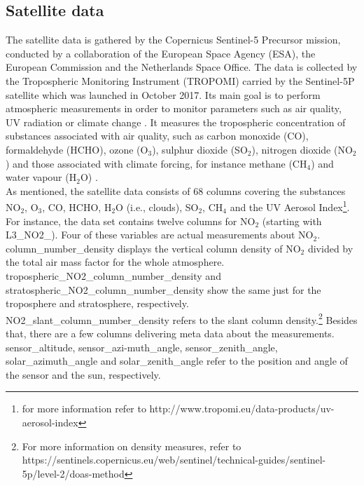 \documentclass{article}
\begin{document}
\subsection{Satellite data}
The satellite data is gathered by the Copernicus Sentinel-5 Precursor mission, conducted by a collaboration of the European Space Agency (ESA), the European Commission and the Netherlands Space Office. The data is collected by the Tropospheric Monitoring Instrument (TROPOMI) carried by the Sentinel-5P satellite which was launched in October 2017. Its main goal is to perform atmospheric measurements in order to monitor parameters such as air quality, UV radiation or climate change  \citep{esa_sentinel-mission-page_nodate}.
It measures the tropospheric concentration of substances associated with air quality, such as carbon monoxide (CO), formaldehyde (HCHO), ozone (O$_3$), sulphur dioxide (SO$_2$), nitrogen dioxide (NO$_2$) and those associated with climate forcing, for instance methane (CH$_4$) and water vapour (H$_2$O) \citep{esa_thematic_nodate}. \\
As mentioned, the satellite data consists of 68 columns covering the substances NO$_2$, O$_3$, CO, HCHO, H$_2$O (i.e., clouds), SO$_2$, CH$_4$ and the UV Aerosol Index\footnote{for more information refer to http://www.tropomi.eu/data-products/uv-aerosol-index}. \\
For instance, the data set contains twelve columns for NO$_2$ (starting with {\selectfont L3\_NO2\_}). Four of these variables are actual measurements about NO$_2$. {\selectfont column\_number\_density} displays the vertical column density of NO$_2$ divided by the total air mass factor for the whole atmosphere. \\ {\selectfont tropospheric\_NO2\_column\_number\_density} and \\ {\selectfont stratospheric\_NO2\_column\_number\_density} show the same just for the troposphere and stratosphere, respectively. \\ {\selectfont NO2\_slant\_column\_number\_density} refers to the slant column density.\footnote{For more information on density measures, refer to https://sentinels.copernicus.eu/web/sentinel/technical-guides/sentinel-5p/level-2/doas-method} Besides that, there are a few columns delivering meta data about the measurements.
{\selectfont sensor\_altitude},  {\selectfont sensor\_azi-muth\_angle}, {\selectfont sensor\_zenith\_angle}, {\selectfont solar\_azimuth\_angle} and  {\selectfont solar\_zenith\_angle} refer to the position and angle of the sensor and the sun, respectively. \citep{noauthor_sentinel-5p_nodate}
\end{document}
